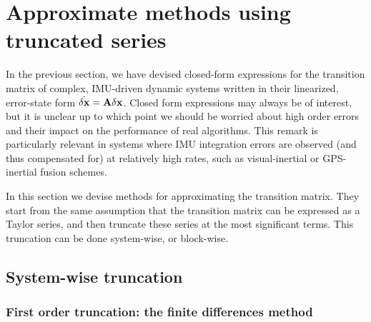 
\section{Approximate methods using truncated series}

In the previous section, we have devised closed-form expressions for the transition matrix of complex, IMU-driven dynamic systems written in their linearized, error-state form $\dot{\delta{\bf x}}={\bf A}\delta{\bf x}$. 
Closed form expressions may always be of interest, but it is unclear up to which point we should be worried about high order errors and their impact on the performance of real algorithms. 
This remark is particularly relevant in systems where IMU integration errors are observed (and thus compensated for) at relatively high rates, such as visual-inertial or GPS-inertial fusion schemes.

In this section we devise methods for approximating the transition matrix. 
They start from the same assumption that the transition matrix can be expressed as a Taylor series, and then truncate these series at the most significant terms. 
This truncation can be done system-wise, or block-wise.

\subsection{System-wise truncation}

\subsubsection{First order truncation: the finite differences method}

